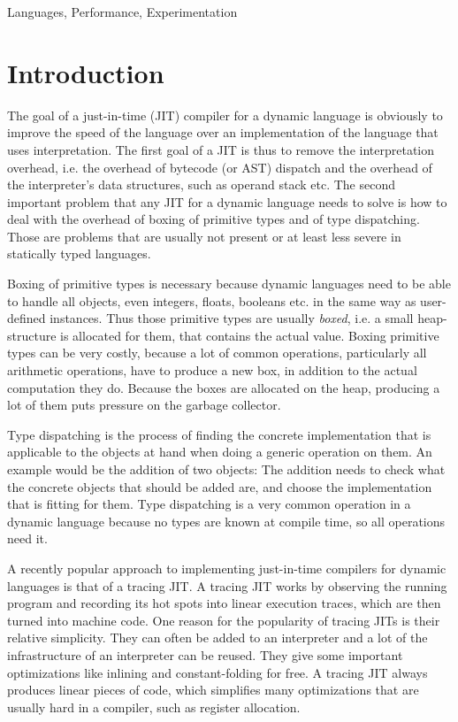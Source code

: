 \documentclass{sigplanconf}
\begin{document}
\terms
Languages, Performance, Experimentation


\section{Introduction}

The goal of a just-in-time (JIT) compiler for a dynamic language is obviously to
improve the speed of the language over an implementation of the language that
uses interpretation. The first goal of a JIT is thus to remove the
interpretation overhead, i.e. the overhead of bytecode (or AST) dispatch and the
overhead of the interpreter's data structures, such as operand stack etc. The
second important problem that any JIT for a dynamic language needs to solve is
how to deal with the overhead of boxing of primitive types and of type
dispatching. Those are problems that are usually not present or at least less
severe in statically typed languages.

Boxing of primitive types is necessary because dynamic languages need to be able to handle
all objects, even integers, floats, booleans etc. in the same way as user-defined
instances. Thus those primitive types are usually \emph{boxed}, i.e. a small
heap-structure is allocated for them, that contains the actual value. Boxing
primitive types can be very costly, because a lot of common operations,
particularly all arithmetic operations, have to produce a new box, in addition
to the actual computation they do. Because the boxes are allocated on the heap,
producing a lot of them puts pressure on the garbage collector.

Type dispatching is the process of finding the concrete implementation that is
applicable to the objects at hand when doing a generic operation on them. An
example would be the addition of two objects: The addition needs to check what
the concrete objects that should be added are, and choose the implementation
that is fitting for them. Type dispatching is a very common operation in a
dynamic language because no types are known at compile time, so all operations
need it.

A recently popular approach to implementing just-in-time compilers for dynamic
languages is that of a tracing JIT. A tracing JIT works by observing the running
program and recording its hot spots into linear execution traces, which are then turned into
machine code. One reason for the popularity of tracing JITs is their relative
simplicity. They can often be added to an interpreter and a lot of the
infrastructure of an interpreter can be reused. They give some important
optimizations like inlining and constant-folding for free. A tracing JIT always
produces linear pieces of code, which simplifies many optimizations that are usually
hard in a compiler, such as register allocation.
\end{document}
